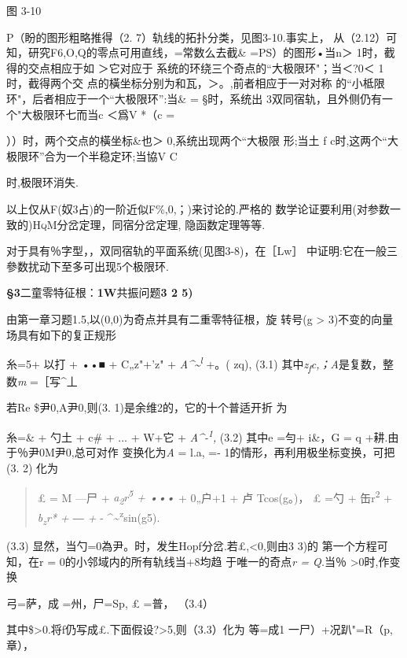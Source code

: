 \documentclass{article}
\begin{document}
图 3-10

P（盼的图形粗略推得（2. 7）轨线的拓扑分类，见图3-10.事实上，
从（2.12）可知，研究F6,O,Q的零点可用直线，=常数么去截\&
=PS）的图形•当n＞ 1时，截得的交点相应于如 ＞它对应于
系统的环绕三个奇点的``大极限环"；当\textbar{}＜?0＜ 1时，截得两个交
点的橫坐标分别为和瓦，＞。,前者相应于一对对称
的``小柢限环"，后者相应于一个``大极限环'':当\& = §时，系统出
3双同宿轨，且外侧仍有一个"大极限环七而当c ＜爲V *（c =

））时，两个交点的橫坐标\&也＞ 0,系统出现两个``大极限 形;当土 f
c时,这两个``大极限环''合为一个半稳定环;当協V C

时,极限环消失.

以上仅从F(奴3占)的一阶近似F\%,0,；)来讨论的.严格的
数学论证要利用(对参数一致的)\textsc{HqM}分岔定理，同宿分岔定理,
隐函数定理等等.

对于具有％字型，，双同宿轨的平面系统(见图3-8)，在［Lw］
中证明:它在一般三參数扰动下至多可出现5个极限环.

\textbf{§3}二童零特征根：\textbf{1W}共振问题\textbf{3 2 5)}

由第一章习题1.5,以(0,0)为奇点并具有二重零特征根，旋 转号(g
\textgreater{} 3)不变的向量场具有如下的复正规形

糸=5+ 以打 + ••■ + C„z"+'z" +
\emph{A\^{}\textasciitilde{}\textsuperscript{l}} +。(
\textbar{}z\textbar{}q), (3.1)
其中\emph{z\textsubscript{f}c,；A}是复数，整数\emph{m} =［写\^{}丄

若Re \$尹0,A尹0,则(3. 1)是余维2的，它的十个普适开折 为

糸=\& + 勺土 + c\# + ... + W+它 + \emph{A\^{}-\textsuperscript{1},}
(3.2) 其中e =勻+ i\&，G = q +耕.由于％尹0M尹0,总可对作 变换化为\emph{A}
= l.a, =- 1的情形，再利用极坐标变换，可把(3. 2) 化为

\begin{quote}
£ = M ---尸 + \emph{a\textsubscript{2}r\textsuperscript{5} + •••} +
0„户+1 + 卢 Tcos(g。)， £ =勺 + 缶r\textsuperscript{2} +
\emph{b\textsubscript{z}r* + ― +} -
\^{}\textasciitilde{}\textsuperscript{z}sin(g5).
\end{quote}

(3.3) 显然，当勺=0為尹。时，发生Hopf分岔.若£,\textless{}0,则由3 3)的
第一个方程可知，在r = 0的小邻域内的所有轨线当+8均趋 于唯一的奇点\emph{r
= Q.}当％ \textgreater{}0时,作变换

弓=萨，成 =州，尸=Sp, £ =普， （3.4）

其中\$\textgreater{}0.将f仍写成£.下面假设?\textgreater{}5,则（3.3）化为
等=成1 一尸）+况趴"=R（p,章），
\end{document}
